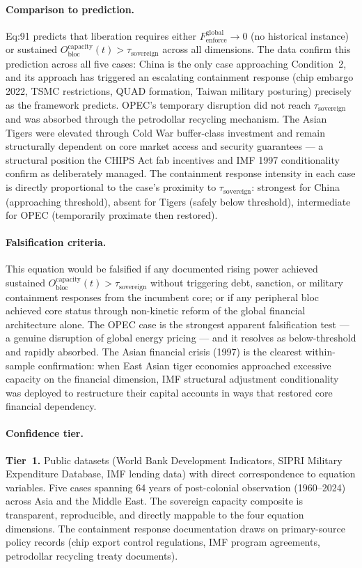 \paragraph{Comparison to prediction.}
Eq:91 predicts that liberation requires either $F_{\text{enforce}}^{\text{global}} \rightarrow 0$ (no historical instance) or sustained $O_{\text{bloc}}^{\text{capacity}}(t) > \tau_{\text{sovereign}}$ across all dimensions. The data confirm this prediction across all five cases: China is the only case approaching Condition~2, and its approach has triggered an escalating containment response (chip embargo 2022, TSMC restrictions, QUAD formation, Taiwan military posturing) precisely as the framework predicts. OPEC's temporary disruption did not reach $\tau_{\text{sovereign}}$ and was absorbed through the petrodollar recycling mechanism. The Asian Tigers were elevated through Cold War buffer-class investment and remain structurally dependent on core market access and security guarantees --- a structural position the CHIPS Act fab incentives and IMF 1997 conditionality confirm as deliberately managed. The containment response intensity in each case is directly proportional to the case's proximity to $\tau_{\text{sovereign}}$: strongest for China (approaching threshold), absent for Tigers (safely below threshold), intermediate for OPEC (temporarily proximate then restored).

\paragraph{Falsification criteria.}
This equation would be falsified if any documented rising power achieved sustained $O_{\text{bloc}}^{\text{capacity}}(t) > \tau_{\text{sovereign}}$ without triggering debt, sanction, or military containment responses from the incumbent core; or if any peripheral bloc achieved core status through non-kinetic reform of the global financial architecture alone. The OPEC case is the strongest apparent falsification test --- a genuine disruption of global energy pricing --- and it resolves as below-threshold and rapidly absorbed. The Asian financial crisis (1997) is the clearest within-sample confirmation: when East Asian tiger economies approached excessive capacity on the financial dimension, IMF structural adjustment conditionality was deployed to restructure their capital accounts in ways that restored core financial dependency.

\paragraph{Confidence tier.}
\textbf{Tier~1.} Public datasets (World Bank Development Indicators, SIPRI Military Expenditure Database, IMF lending data) with direct correspondence to equation variables. Five cases spanning 64 years of post-colonial observation (1960--2024) across Asia and the Middle East. The sovereign capacity composite is transparent, reproducible, and directly mappable to the four equation dimensions. The containment response documentation draws on primary-source policy records (chip export control regulations, IMF program agreements, petrodollar recycling treaty documents).

